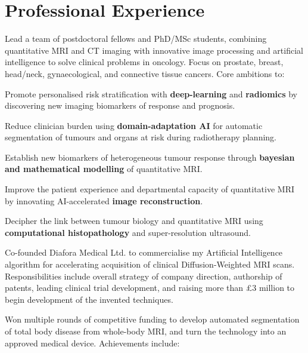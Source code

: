 \documentclass[]{mbcv}
\begin{document}
\begin{minipage}[t]{0.65\textwidth}

\section{Professional Experience}
Lead a team of postdoctoral fellows and PhD/MSc students, combining quantitative MRI and CT imaging with innovative image processing and artificial intelligence to solve clinical problems in oncology. Focus on prostate, breast, head/neck, gynaecological, and connective tissue cancers. Core ambitions to:
 
\vspace*{15pt}
\begin{tightemize}
\item Promote personalised risk stratification with \textbf{deep-learning} and \textbf{radiomics} by discovering new imaging biomarkers of response and prognosis.
\item Reduce clinician burden using \textbf{domain-adaptation AI} for automatic segmentation of tumours and organs at risk during radiotherapy planning.
\item Establish new biomarkers of heterogeneous tumour response through \textbf{bayesian and mathematical modelling} of quantitative MRI.
\item Improve the patient experience and departmental capacity of quantitative MRI by innovating AI-accelerated \textbf{image reconstruction}.
\item Decipher the link between tumour biology and quantitative MRI using \textbf{computational histopathology} and super-resolution ultrasound.
\end{tightemize}

\sectionsep

Co-founded Diafora Medical Ltd. to commercialise my Artificial Intelligence algorithm for accelerating acquisition of clinical Diffusion-Weighted MRI scans. Responsibilities include overall strategy of company direction, authorship of patents, leading clinical trial development, and raising more than £3 million to begin development of the invented techniques.

\sectionsep

Won multiple rounds of competitive funding to develop automated segmentation of total body disease from whole-body MRI, and turn the technology into an approved medical device. Achievements include:


\end{minipage}
\end{document}
